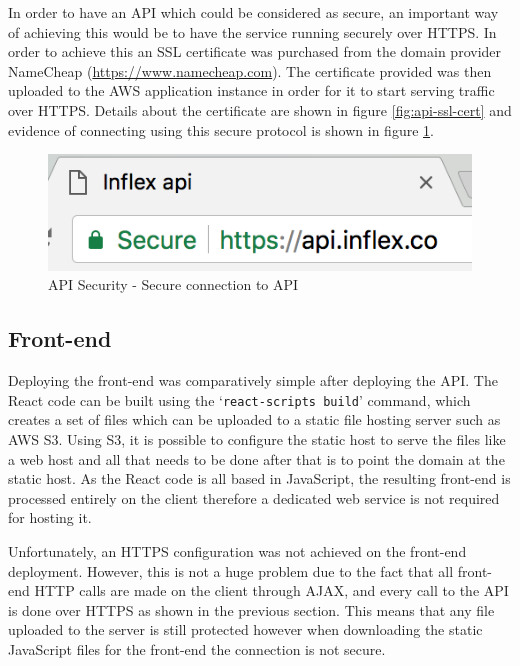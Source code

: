 \documentclass[a4paper,12pt]{report}
\begin{document}
      In order to have an API which could be considered as secure, an important way of achieving this would be to have the service running securely over HTTPS. In order to achieve this an SSL certificate was purchased from the domain provider NameCheap (\url{https://www.namecheap.com}). The certificate provided was then uploaded to the AWS application instance in order for it to start serving traffic over HTTPS. Details about the certificate are shown in figure \ref{fig:api-ssl-cert} and evidence of connecting using this secure protocol is shown in figure \ref{fig:api-ssl-connection}.

      \begin{figure}[h]
        \centering
        \includegraphics[width=0.3\linewidth]{api-ssl-connection}
        \caption{API Security - Secure connection to API}
        \label{fig:api-ssl-connection}
      \end{figure}

    \subsection{Front-end}
      Deploying the front-end was comparatively simple after deploying the API. The React code can be built using the ‘\texttt{react-scripts build}’ command, which creates a set of files which can be uploaded to a static file hosting server such as AWS S3. Using S3, it is possible to configure the static host to serve the files like a web host and all that needs to be done after that is to point the domain at the static host. As the React code is all based in JavaScript, the resulting front-end is processed entirely on the client therefore a dedicated web service is not required for hosting it.

      Unfortunately, an HTTPS configuration was not achieved on the front-end deployment. However, this is not a huge problem due to the fact that all front-end HTTP calls are made on the client through AJAX, and every call to the API is done over HTTPS as shown in the previous section. This means that any file uploaded to the server is still protected however when downloading the static JavaScript files for the front-end the connection is not secure.
\end{document}
